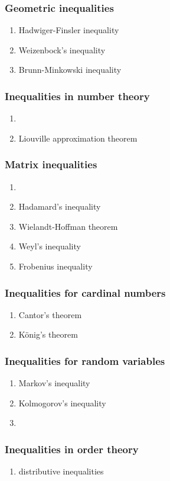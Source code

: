 \documentclass[12pt]{article}
\begin{document}
\subsubsection*{Geometric inequalities}
\begin{enumerate}
\item Hadwiger-Finsler inequality
\item Weizenbock's inequality 
\item Brunn-Minkowski inequality
\end{enumerate}

\subsubsection*{Inequalities in number theory}
\begin{enumerate}
\item {}
\item Liouville approximation theorem
\end{enumerate}

\subsubsection*{Matrix inequalities}
\begin{enumerate}
\item {} 
\item Hadamard's inequality
\item Wielandt-Hoffman theorem
\item Weyl's inequality
\item Frobenius inequality
\end{enumerate}

\subsubsection*{Inequalities for cardinal numbers}
\begin{enumerate}
\item Cantor's theorem
\item K\"onig's theorem
\end{enumerate}

\subsubsection*{Inequalities for random variables}
\begin{enumerate}
\item Markov's inequality
\item Kolmogorov's inequality
\item {}
\end{enumerate}

\subsubsection*{Inequalities in order theory}
\begin{enumerate}
\item distributive inequalities
\end{enumerate}
\end{document}
